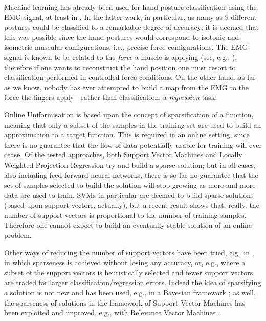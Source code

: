 Machine learning has already been used for hand posture classification
using the EMG signal, at least in \cite{dunlop,fukuda,smagt}. In the
latter work, in particular, as many as $9$ different postures could be
classified to a remarkable degree of accuracy; it is deemed that this
was possible since the hand postures would correspond to isotonic and
isometric muscular configurations, i.e., precise force
configurations. The EMG signal is known to be related to the
\emph{force} a muscle is applying (see, e.g., \cite{deluca}),
therefore if one wants to reconstruct the hand position one must
resort to classification performed in controlled force conditions. On
the other hand, as far as we know, nobody has ever attempted to build
a map from the EMG to the force the fingers apply---rather than
classification, a \emph{regression} task.

Online Uniformisation is based upon the concept of sparsification of a
function, meaning that only a subset of the samples in the training
set are used to build an approximation to a target function. This is
required in an online setting, since there is no guarantee that the
flow of data potentially usable for training will ever cease. Of the
tested approaches, both Support Vector Machines and Locally Weighted
Projection Regression try and build a sparse solution; but in all
cases, also including feed-forward neural networks, there is so far no
guarantee that the set of samples selected to build the solution will
stop growing as more and more data are used to train. SVMs in
particular are deemed to build sparse solutions (based upon support
vectors, actually), but a recent result \cite{Steinwart03} shows that,
really, the number of support vectors is proportional to the number of
training samples. Therefore one cannot expect to build an eventually
stable solution of an online problem.

Other ways of reducing the number of support vectors have been tried,
e.g.\ in \cite{bmvc}, in which sparseness is achieved without losing any
accuracy, or, e.g., \cite{LeeM01,KeerthiCDC06} where a subset of the
support vectors is heuristically selected and fewer support vectors are
traded for larger classification/regression errors. Indeed the idea of
sparsifying a solution is not new and has been used, e.g., in a
Bayesian framework \cite{figueiredo03adaptive}; as well, the
sparseness of solutions in the framework of Support Vector Machines
has been exploited and improved, e.g., with Relevance Vector Machines
\cite{tipping00relevance}.
